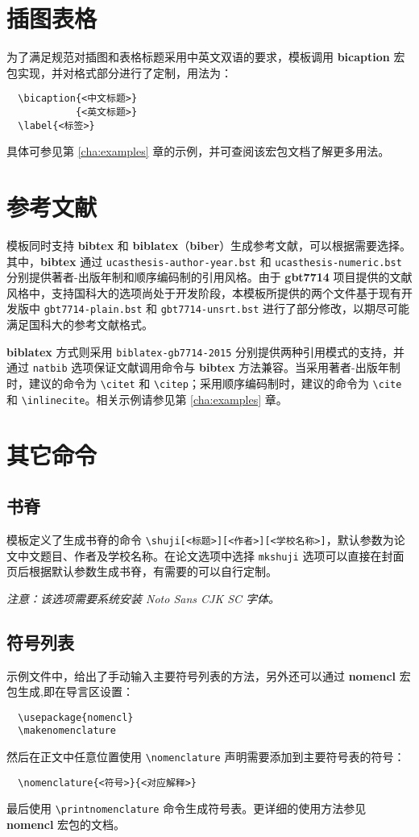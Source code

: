 \section{插图表格}
\label{sec:fig_tab}

为了满足规范对插图和表格标题采用中英文双语的要求，模板调用 \textbf{bicaption} 宏包实现，并对格式部分进行了定制，用法为：
\begin{verbatim}
  \bicaption{<中文标题>}
            {<英文标题>}
  \label{<标签>}
\end{verbatim}
具体可参见第 \ref{cha:examples} 章的示例，并可查阅该宏包文档了解更多用法。

\section{参考文献}
\label{sec:ref}

模板同时支持 \textbf{bibtex} 和 \textbf{biblatex}（\textbf{biber}）生成参考文献，可以根据需要选择。其中，\textbf{bibtex} 通过 \texttt{ucasthesis-author-year.bst} 和 \texttt{ucasthesis-numeric.bst} 分别提供著者-出版年制和顺序编码制的引用风格。由于 \textbf{gbt7714} 项目提供的文献风格中，支持国科大的选项尚处于开发阶段，本模板所提供的两个文件基于现有开发版中 \texttt{gbt7714-plain.bst} 和 \texttt{gbt7714-unsrt.bst} 进行了部分修改，以期尽可能满足国科大的参考文献格式。

\textbf{biblatex} 方式则采用 \texttt{biblatex-gb7714-2015} 分别提供两种引用模式的支持，并通过 \texttt{natbib} 选项保证文献调用命令与 \textbf{bibtex} 方法兼容。当采用著者-出版年制时，建议的命令为 \verb|\citet| 和 \verb|\citep|；采用顺序编码制时，建议的命令为 \verb|\cite| 和 \verb|\inlinecite|。相关示例请参见第 \ref{cha:examples} 章。

\section{其它命令}
\label{sec:other}

\subsection{书脊}

模板定义了生成书脊的命令 \verb|\shuji[<标题>][<作者>][<学校名称>]|，默认参数为论文中文题目、作者及学校名称。在论文选项中选择 \texttt{mkshuji} 选项可以直接在封面页后根据默认参数生成书脊，有需要的可以自行定制。

\emph{注意：该选项需要系统安装 Noto Sans CJK SC 字体。}

\subsection{符号列表}

示例文件中，给出了手动输入主要符号列表的方法，另外还可以通过 \textbf{nomencl} 宏包生成,即在导言区设置：
\begin{verbatim}
  \usepackage{nomencl}
  \makenomenclature
\end{verbatim}
然后在正文中任意位置使用 \verb|\nomenclature| 声明需要添加到主要符号表的符号：
\begin{verbatim}
  \nomenclature{<符号>}{<对应解释>}
\end{verbatim}
最后使用 \verb|\printnomenclature| 命令生成符号表。更详细的使用方法参见 \textbf{nomencl} 宏包的文档。